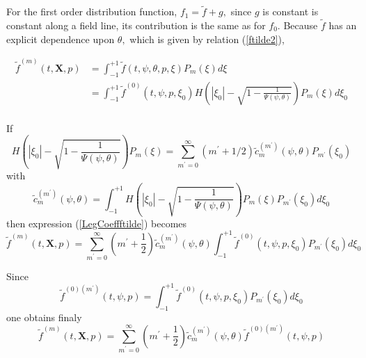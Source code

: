 For the first order distribution function, $f_{1}=\widetilde{f}+g,$ since $g$
is constant is constant along a field line, its contribution is the same as
for $f_{0}$. Because $\widetilde{f}$ has an explicit dependence upon $%
\theta, $ which is given by relation (\ref{ftilde2}),

\begin{align}  \label{LegCoeffftilde}
\widetilde{f}^{\left( m\right) }\left( t,\mathbf{X},p\right) &
=\int_{-1}^{+1}\widetilde{f}\left( t,\psi,\theta,p,\xi\right) P_{m}\left(
\xi\right) d\xi  \nonumber \\
& =\int_{-1}^{+1}\widetilde{f}^{\left( 0\right) }\left( t,\psi,p,\xi
_{0}\right) H\left( \left| \xi_{0}\right| -\sqrt{1-\frac{1}{\Psi\left(
\psi,\theta\right) }}\right) P_{m}\left( \xi\right) d\xi_{0}  \nonumber \\
\end{align}

If
\begin{equation}
H\left( \left| \xi _{0}\right| -\sqrt{1-\frac{1}{\Psi \left( \psi ,\theta
\right) }}\right) P_{m}\left( \xi \right) =\sum_{m^{\prime }=0}^{\infty %
}\left( m^{\prime }+1/2\right) \widetilde{c}_{m}^{\left( m^{\prime }\right)
}\left( \psi ,\theta \right) P_{m^{\prime }}\left( \xi _{0}\right)
\end{equation}
with
\begin{equation}
\widetilde{c}_{m}^{\left( m^{\prime }\right) }\left( \psi ,\theta \right)
=\int_{-1}^{+1}H\left( \left| \xi _{0}\right| -\sqrt{1-\frac{1}{\Psi \left(
\psi ,\theta \right) }}\right) P_{m}\left( \xi \right) P_{m^{\prime }}\left(
\xi _{0}\right) d\xi _{0}
\end{equation}
then expression (\ref{LegCoeffftilde}) becomes
\begin{equation}
\widetilde{f}^{\left( m\right) }\left( t,\mathbf{X},p\right)
=\sum_{m^{\prime }=0}^{\infty }\left( m^{\prime }+\frac{1}{2}\right)
\widetilde{c}_{m}^{\left( m^{\prime }\right) }\left( \psi ,\theta \right)
\int_{-1}^{+1}\widetilde{f}^{\left( 0\right) }\left( t,\psi ,p,\xi
_{0}\right) P_{m^{\prime }}\left( \xi _{0}\right) d\xi _{0}
\end{equation}

Since
\begin{equation}
\widetilde{f}^{\left( 0\right) \left( m^{\prime }\right) }\left( t,\psi
,p\right) =\int_{-1}^{+1}\widetilde{f}^{\left( 0\right) }\left( t,\psi
,p,\xi _{0}\right) P_{m^{\prime }}\left( \xi _{0}\right) d\xi _{0}
\end{equation}
one obtains finaly
\begin{equation}
\widetilde{f}^{\left( m\right) }\left( t,\mathbf{X},p\right)
=\sum_{m^{\prime }=0}^{\infty }\left( m^{\prime }+\frac{1}{2}\right)
\widetilde{c}_{m}^{\left( m^{\prime }\right) }\left( \psi ,\theta \right)
\widetilde{f}^{\left( 0\right) \left( m^{\prime }\right) }\left( t,\psi
,p\right)
\end{equation}

